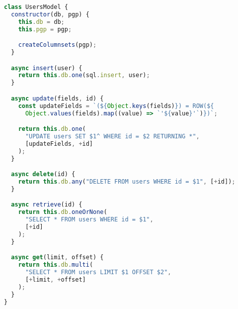 \begin{lstlisting}[language=JavaScript,caption={Express.js user model},breaklines=true,label={lst:expressModel}]
class UsersModel {
  constructor(db, pgp) {
    this.db = db;
    this.pgp = pgp;

    createColumnsets(pgp);
  }

  async insert(user) {
    return this.db.one(sql.insert, user);
  }

  async update(fields, id) {
    const updateFields = `(${Object.keys(fields)}) = ROW(${
      Object.values(fields).map((value) => `'${value}'`)})`;

    return this.db.one(
      "UPDATE users SET $1^ WHERE id = $2 RETURNING *",
      [updateFields, +id]
    );
  }

  async delete(id) {
    return this.db.any("DELETE FROM users WHERE id = $1", [+id]);
  }

  async retrieve(id) {
    return this.db.oneOrNone(
      "SELECT * FROM users WHERE id = $1",
      [+id]
    );
  }

  async get(limit, offset) {
    return this.db.multi(
      "SELECT * FROM users LIMIT $1 OFFSET $2",
      [+limit, +offset]
    );
  }
}
\end{lstlisting}
